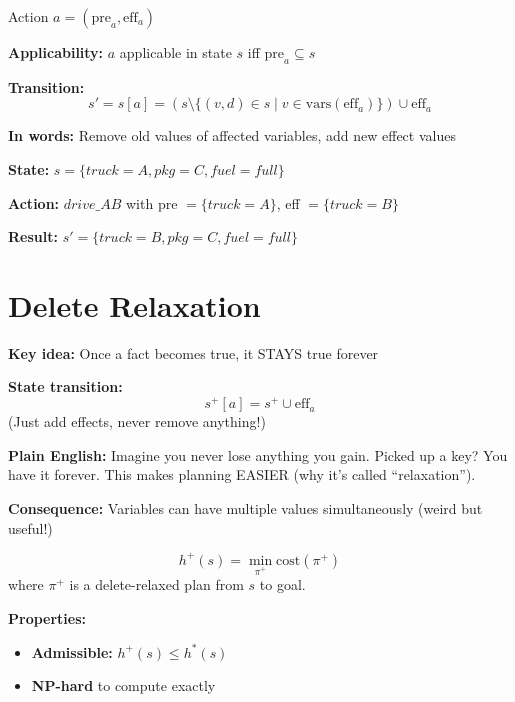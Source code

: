 \documentclass[11pt,a4paper]{article}
\begin{document}
\begin{definitionbox}
Action $a = (\text{pre}_a, \text{eff}_a)$

\textbf{Applicability:} $a$ applicable in state $s$ iff $\text{pre}_a \subseteq s$

\textbf{Transition:}
\[s' = s[a] = (s \setminus \{(v,d) \in s \mid v \in \text{vars}(\text{eff}_a)\}) \cup \text{eff}_a\]

\textbf{In words:} Remove old values of affected variables, add new effect values
\end{definitionbox}

\begin{examplebox}
\textbf{State:} $s = \{truck{=}A, pkg{=}C, fuel{=}full\}$

\textbf{Action:} $drive\_AB$ with pre $= \{truck{=}A\}$, eff $= \{truck{=}B\}$

\textbf{Result:} $s' = \{truck{=}B, pkg{=}C, fuel{=}full\}$
\end{examplebox}

\section{Delete Relaxation}

\begin{definitionbox}
\textbf{Key idea:} Once a fact becomes true, it STAYS true forever

\textbf{State transition:}
\[s^+[a] = s^+ \cup \text{eff}_a\]
(Just add effects, never remove anything!)

\textbf{Plain English:} Imagine you never lose anything you gain. Picked up a key? You have it forever. This makes planning EASIER (why it's called ``relaxation'').

\textbf{Consequence:} Variables can have multiple values simultaneously (weird but useful!)
\end{definitionbox}

\begin{definitionbox}
\[h^+(s) = \min_{\pi^+} \text{cost}(\pi^+)\]
where $\pi^+$ is a delete-relaxed plan from $s$ to goal.

\textbf{Properties:}
\begin{itemize}[leftmargin=*,nosep]
\item \textbf{Admissible:} $h^+(s) \leq h^*(s)$
\item \textbf{NP-hard} to compute exactly
\end{itemize}
\end{definitionbox}
\end{document}
